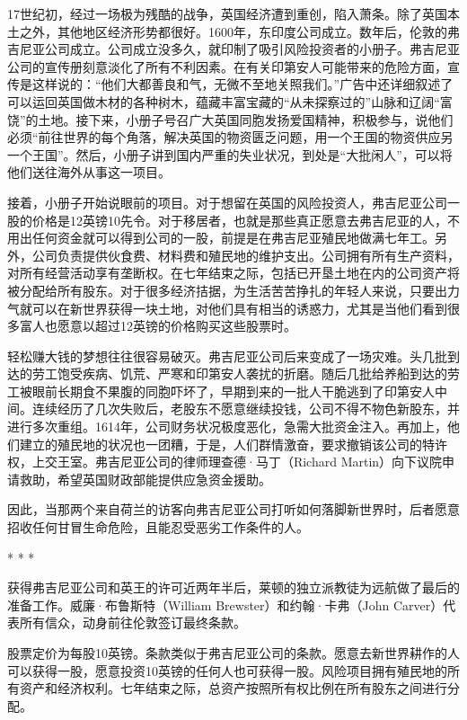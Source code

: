 \documentclass[12pt,oneside]{book}
\begin{document}
\begin{mdframed}
17世纪初，经过一场极为残酷的战争，英国经济遭到重创，陷入萧条。除了英国本土之外，其他地区经济形势都很好。1600年，东印度公司成立。数年后，伦敦的弗吉尼亚公司成立。公司成立没多久，就印制了吸引风险投资者的小册子。弗吉尼亚公司的宣传册刻意淡化了所有不利因素。在有关印第安人可能带来的危险方面，宣传是这样说的：“他们大都善良和气，无微不至地关照我们。”广告中还详细叙述了可以运回英国做木材的各种树木，蕴藏丰富宝藏的“从未探察过的”山脉和辽阔“富饶”的土地。接下来，小册子号召广大英国同胞发扬爱国精神，积极参与，说他们必须“前往世界的每个角落，解决英国的物资匮乏问题，用一个王国的物资供应另一个王国”。然后，小册子讲到国内严重的失业状况，到处是“大批闲人”，可以将他们送往海外从事这一项目。

接着，小册子开始说眼前的项目。对于想留在英国的风险投资人，弗吉尼亚公司一股的价格是12英镑10先令。对于移居者，也就是那些真正愿意去弗吉尼亚的人，不用出任何资金就可以得到公司的一股，前提是在弗吉尼亚殖民地做满七年工。另外，公司负责提供伙食费、材料费和殖民地的维护支出。公司拥有所有生产资料，对所有经营活动享有垄断权。在七年结束之际，包括已开垦土地在内的公司资产将被分配给所有股东。对于很多经济拮据，为生活苦苦挣扎的年轻人来说，只要出力气就可以在新世界获得一块土地，对他们具有相当的诱惑力，尤其是当他们看到很多富人也愿意以超过12英镑的价格购买这些股票时。

轻松赚大钱的梦想往往很容易破灭。弗吉尼亚公司后来变成了一场灾难。头几批到达的劳工饱受疾病、饥荒、严寒和印第安人袭扰的折磨。随后几批给养船到达的劳工被眼前长期食不果腹的同胞吓坏了，早期到来的一批人干脆逃到了印第安人中间。连续经历了几次失败后，老股东不愿意继续投钱，公司不得不物色新股东，并进行多次重组。1614年，公司财务状况极度恶化，急需大批资金注入。再加上，他们建立的殖民地的状况也一团糟，于是，人们群情激奋，要求撤销该公司的特许权，上交王室。弗吉尼亚公司的律师理查德·马丁（Richard Martin）向下议院申请救助，希望英国财政部能提供应急资金援助。

因此，当那两个来自荷兰的访客向弗吉尼亚公司打听如何落脚新世界时，后者愿意招收任何甘冒生命危险，且能忍受恶劣工作条件的人。

\begin{center}
* * *
\end{center}

获得弗吉尼亚公司和英王的许可近两年半后，莱顿的独立派教徒为远航做了最后的准备工作。威廉·布鲁斯特（William Brewster）和约翰·卡弗（John Carver）代表所有信众，动身前往伦敦签订最终条款。

股票定价为每股10英镑。条款类似于弗吉尼亚公司的条款。愿意去新世界耕作的人可以获得一股，愿意投资10英镑的任何人也可获得一股。风险项目拥有殖民地的所有资产和经济权利。七年结束之际，总资产按照所有权比例在所有股东之间进行分配。


\end{mdframed}
\end{document}
